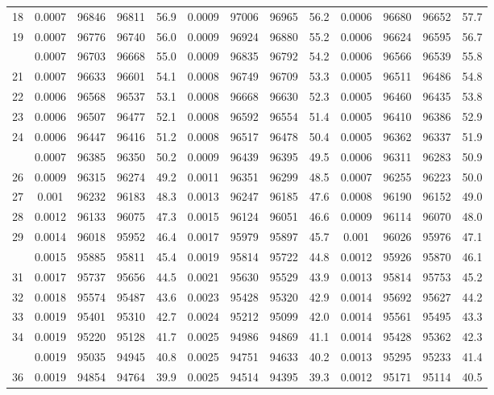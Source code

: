 \documentclass[
  14pt,
]{article}
\begin{document}
\begin{longtable}[t]{lcccccccccccc}
18 & 0.0007 & 96846 & 96811 & 56.9 & 0.0009 & 97006 & 96965 & 56.2 & 0.0006 & 96680 & 96652 & 57.7\\
19 & 0.0007 & 96776 & 96740 & 56.0 & 0.0009 & 96924 & 96880 & 55.2 & 0.0006 & 96624 & 96595 & 56.7\\
\addlinespace
20 & 0.0007 & 96703 & 96668 & 55.0 & 0.0009 & 96835 & 96792 & 54.2 & 0.0006 & 96566 & 96539 & 55.8\\
21 & 0.0007 & 96633 & 96601 & 54.1 & 0.0008 & 96749 & 96709 & 53.3 & 0.0005 & 96511 & 96486 & 54.8\\
22 & 0.0006 & 96568 & 96537 & 53.1 & 0.0008 & 96668 & 96630 & 52.3 & 0.0005 & 96460 & 96435 & 53.8\\
23 & 0.0006 & 96507 & 96477 & 52.1 & 0.0008 & 96592 & 96554 & 51.4 & 0.0005 & 96410 & 96386 & 52.9\\
24 & 0.0006 & 96447 & 96416 & 51.2 & 0.0008 & 96517 & 96478 & 50.4 & 0.0005 & 96362 & 96337 & 51.9\\
\addlinespace
25 & 0.0007 & 96385 & 96350 & 50.2 & 0.0009 & 96439 & 96395 & 49.5 & 0.0006 & 96311 & 96283 & 50.9\\
26 & 0.0009 & 96315 & 96274 & 49.2 & 0.0011 & 96351 & 96299 & 48.5 & 0.0007 & 96255 & 96223 & 50.0\\
27 & 0.001 & 96232 & 96183 & 48.3 & 0.0013 & 96247 & 96185 & 47.6 & 0.0008 & 96190 & 96152 & 49.0\\
28 & 0.0012 & 96133 & 96075 & 47.3 & 0.0015 & 96124 & 96051 & 46.6 & 0.0009 & 96114 & 96070 & 48.0\\
29 & 0.0014 & 96018 & 95952 & 46.4 & 0.0017 & 95979 & 95897 & 45.7 & 0.001 & 96026 & 95976 & 47.1\\
\addlinespace
30 & 0.0015 & 95885 & 95811 & 45.4 & 0.0019 & 95814 & 95722 & 44.8 & 0.0012 & 95926 & 95870 & 46.1\\
31 & 0.0017 & 95737 & 95656 & 44.5 & 0.0021 & 95630 & 95529 & 43.9 & 0.0013 & 95814 & 95753 & 45.2\\
32 & 0.0018 & 95574 & 95487 & 43.6 & 0.0023 & 95428 & 95320 & 42.9 & 0.0014 & 95692 & 95627 & 44.2\\
33 & 0.0019 & 95401 & 95310 & 42.7 & 0.0024 & 95212 & 95099 & 42.0 & 0.0014 & 95561 & 95495 & 43.3\\
34 & 0.0019 & 95220 & 95128 & 41.7 & 0.0025 & 94986 & 94869 & 41.1 & 0.0014 & 95428 & 95362 & 42.3\\
\addlinespace
35 & 0.0019 & 95035 & 94945 & 40.8 & 0.0025 & 94751 & 94633 & 40.2 & 0.0013 & 95295 & 95233 & 41.4\\
36 & 0.0019 & 94854 & 94764 & 39.9 & 0.0025 & 94514 & 94395 & 39.3 & 0.0012 & 95171 & 95114 & 40.5\\

\end{longtable}
\end{document}
